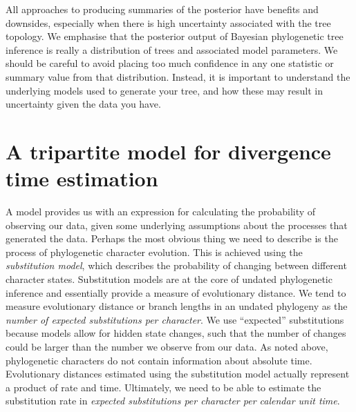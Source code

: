 \documentclass[11pt]{article}
\begin{document}
All approaches to producing summaries of the posterior have benefits and downsides, especially when there is high uncertainty associated with the tree topology.
We emphasise that the posterior output of Bayesian phylogenetic tree inference is really a distribution of trees and associated model parameters. 
We should be careful to avoid placing too much confidence in any one statistic or summary value from that distribution.
Instead, it is important to understand the underlying models used to generate your tree, and how these may result in uncertainty given the data you have.



\section{A tripartite model for divergence time estimation}
 
A model provides us with an expression for calculating the probability of observing our data, given some underlying assumptions about the processes that generated the data. 
Perhaps the most obvious thing we need to describe is the process of phylogenetic character evolution.
This is achieved using the \textit{substitution model}, which describes the probability of changing between different character states.
Substitution models are at the core of undated phylogenetic inference and essentially provide a measure of evolutionary distance.
We tend to measure evolutionary distance or branch lengths in an undated phylogeny as the \textit{number of expected substitutions per character}. We use ``expected'' substitutions because models allow for hidden state changes, such that the number of changes could be larger than the number we observe from our data.
As noted above, phylogenetic characters do not contain information about absolute time. Evolutionary distances estimated using the substitution model actually represent a product of rate and time.
Ultimately, we need to be able to estimate the substitution rate in \textit{expected substitutions per character per calendar unit time}.
\end{document}

